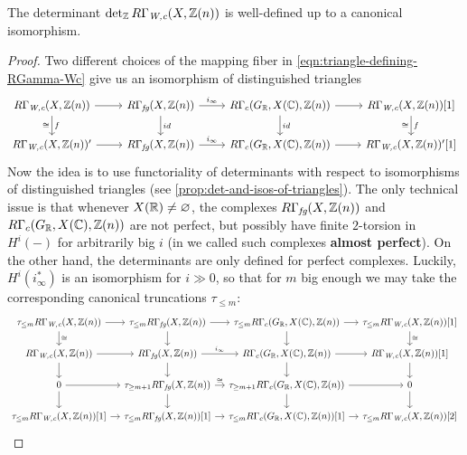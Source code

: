 \documentclass{article}
\numberwithin{equation}{section}
\begin{document}
\begin{lemma}
  \label{lemma:determinant-of-RGamma-Wc-well-defined}
  The determinant $\operatorname{det}_{\mathbb{Z}} R\Gamma_{\text{\it W,c}} (X, \mathbb{Z}(n))$ is well-defined up to a
  canonical isomorphism.

  \begin{proof}
    Two different choices of the mapping fiber in
    \eqref{eqn:triangle-defining-RGamma-Wc} give us an isomorphism of
    distinguished triangles
    \[ \begin{tikzcd}
        R\Gamma_\Wc (X, \ZZ(n)) \ar{r}\ar{d}{f}[swap]{\cong} & R\Gamma_\fg (X,\ZZ(n)) \ar{r}{i_\infty}\ar{d}{id} & R\Gamma_c (G_\RR, X (\CC), \ZZ (n)) \ar{r}\ar{d}{id} & R\Gamma_\Wc (X, \ZZ (n)) [1]\ar{d}{f}[swap]{\cong} \\
        R\Gamma_\Wc (X, \ZZ(n))' \ar{r} & R\Gamma_\fg (X,\ZZ(n)) \ar{r}{i_\infty} & R\Gamma_c (G_\RR, X (\CC), \ZZ (n)) \ar{r} & R\Gamma_\Wc (X, \ZZ (n))' [1]
      \end{tikzcd} \]
    Now the idea is to use functoriality of determinants with respect to
    isomorphisms of distinguished triangles
    (see \ref{prop:det-and-isos-of-triangles}). The only technical issue is that
    whenever $X (\mathbb{R}) \ne \varnothing$, the complexes $R\Gamma_{\text{\it fg}} (X,\mathbb{Z}(n))$ and
    $R\Gamma_c (G_{\mathbb{R}}, X (\mathbb{C}), \mathbb{Z} (n))$ are not perfect, but possibly have
    finite $2$-torsion in $H^i (-)$ for arbitrarily big $i$ (in
    \cite{Beshenov-Weil-etale-1} we called such complexes
    \textbf{almost perfect}). On the other hand, the determinants are only
    defined for perfect complexes. Luckily, $H^i (i_\infty^*)$ is an isomorphism
    for $i \gg 0$, so that for $m$ big enough we may take the corresponding
    canonical truncations $\tau_{\le m}$:
    \[ \begin{tikzcd}[row sep=1.5em, column sep=1em]
        \tau_{\le m} R\Gamma_\Wc (X, \ZZ(n)) \ar{r}\ar{d}{\cong} & \tau_{\le m} R\Gamma_\fg (X,\ZZ(n)) \ar{r}\ar{d} & \tau_{\le m} R\Gamma_c (G_\RR, X (\CC), \ZZ (n)) \ar{r}\ar{d} & \tau_{\le m} R\Gamma_\Wc (X, \ZZ (n)) [1]\ar{d}{\cong} \\
        R\Gamma_\Wc (X, \ZZ(n)) \ar{r}\ar{d} & R\Gamma_\fg (X,\ZZ(n)) \ar{r}{i_\infty}\ar{d} & R\Gamma_c (G_\RR, X (\CC), \ZZ (n)) \ar{r}\ar{d} & R\Gamma_\Wc (X, \ZZ (n)) [1]\ar{d} \\
        0 \ar{r}\ar{d} & \tau_{\ge m+1} R\Gamma_\fg (X,\ZZ(n)) \ar{r}{\cong}\ar{d} & \tau_{\ge m+1} R\Gamma_c (G_\RR, X (\CC), \ZZ (n)) \ar{r}\ar{d} & 0\ar{d} \\
        \tau_{\le m} R\Gamma_\Wc (X, \ZZ(n)) [1] \ar{r} & \tau_{\le m} R\Gamma_\fg (X,\ZZ(n)) [1] \ar{r} & \tau_{\le m} R\Gamma_c (G_\RR, X (\CC), \ZZ (n)) [1] \ar{r} & \tau_{\le m} R\Gamma_\Wc (X, \ZZ (n)) [2]
      \end{tikzcd} \]


\end{proof}
\end{lemma}
\end{document}
